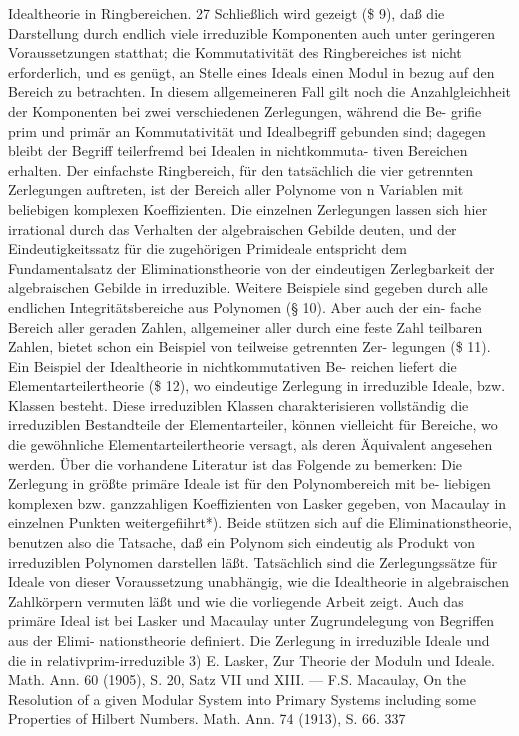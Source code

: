 \documentclass[11pt,a4paper]{article}
\theoremstyle{plain}
\theoremstyle{definition}
\begin{document}
Idealtheorie in Ringbereichen. 
27 
Schließlich 
wird gezeigt (\$ 9), daß 
die Darstellung 
durch endlich 
viele 
irreduzible Komponenten 
auch 
unter geringeren Voraussetzungen 
statthat; die Kommutativität des Ringbereiches ist nicht erforderlich, und 
es genügt, an Stelle eines Ideals einen Modul in bezug auf den Bereich 
zu betrachten. 
In diesem allgemeineren Fall gilt noch die Anzahlgleichheit 
der Komponenten bei zwei verschiedenen Zerlegungen, während die Be- 
grifie prim und primär an Kommutativität 
und Idealbegriff gebunden 
sind; dagegen bleibt der Begriff teilerfremd bei Idealen in nichtkommuta- 
tiven Bereichen erhalten. 
Der einfachste Ringbereich, für den tatsächlich die vier getrennten 
Zerlegungen auftreten, 
ist der Bereich aller Polynome von n Variablen 
mit beliebigen komplexen Koeffizienten. 
Die einzelnen Zerlegungen lassen 
sich hier irrational durch das Verhalten der algebraischen Gebilde deuten, 
und der Eindeutigkeitssatz für die zugehörigen Primideale entspricht dem 
Fundamentalsatz der Eliminationstheorie von der eindeutigen Zerlegbarkeit 
der algebraischen Gebilde in irreduzible. Weitere Beispiele sind gegeben durch 
alle endlichen Integritätsbereiche aus Polynomen (\S{} 10). Aber auch der ein- 
fache Bereich aller geraden Zahlen, allgemeiner aller durch eine feste Zahl 
teilbaren Zahlen, bietet schon ein Beispiel von teilweise getrennten Zer- 
legungen (\$ 11). Ein Beispiel der Idealtheorie in nichtkommutativen Be- 
reichen liefert die Elementarteilertheorie (\$ 12), wo eindeutige Zerlegung 
in irreduzible Ideale, bzw. Klassen 
besteht. 
Diese 
irreduziblen Klassen 
charakterisieren vollständig die irreduziblen Bestandteile der Elementarteiler, 
können vielleicht für Bereiche, wo die gewöhnliche Elementarteilertheorie 
versagt, als deren Äquivalent angesehen werden. 
Über die vorhandene Literatur ist das Folgende zu bemerken: 
Die 
Zerlegung in größte primäre Ideale ist für den Polynombereich mit be- 
liebigen komplexen bzw. ganzzahligen Koeffizienten von Lasker gegeben, 
von Macaulay in einzelnen Punkten weitergefiihrt*). 
Beide stützen 
sich 
auf die Eliminationstheorie, benutzen also die Tatsache, daß ein Polynom 
sich eindeutig 
als Produkt von irreduziblen Polynomen 
darstellen 
läßt. 
Tatsächlich sind die Zerlegungssätze für Ideale von dieser Voraussetzung 
unabhängig, 
wie die Idealtheorie in algebraischen Zahlkörpern vermuten 
läßt und wie die vorliegende Arbeit zeigt. Auch das primäre Ideal ist bei 
Lasker und Macaulay unter Zugrundelegung von Begriffen aus der Elimi- 
nationstheorie definiert. 
Die Zerlegung in irreduzible Ideale und die in relativprim-irreduzible 
3) E. Lasker, Zur Theorie der Moduln und Ideale. 
Math. Ann. 60 (1905), S. 20, 
Satz VII und XIII. --- F.S. Macaulay, On the Resolution of a given Modular System 
into Primary Systems including some Properties of Hilbert Numbers. 
Math. Ann. 74 
(1913), S. 66. 
337
\end{document}
